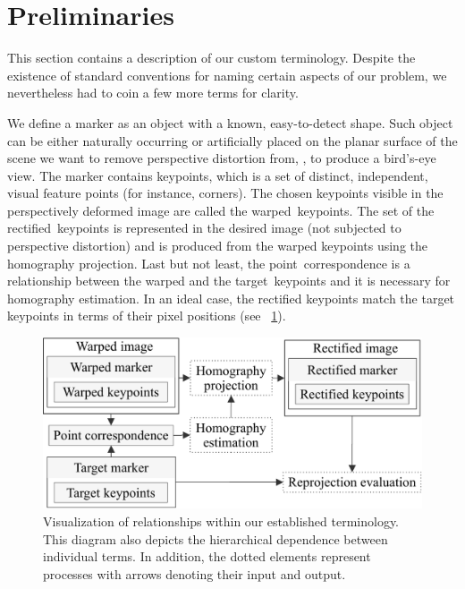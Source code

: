 \section{Preliminaries}
\label{sec:HomographyPreliminaries}

This section contains a description of our custom terminology. Despite the existence of standard conventions for naming certain aspects of our problem, we nevertheless had to coin a few more terms for clarity.

We define a marker as an object with a known, easy-to-detect shape. Such object can be either naturally occurring or artificially placed on the planar surface of the scene we want to remove perspective distortion from, \ietext{}, to produce a bird's-eye view. The marker contains keypoints, which is a set of distinct, independent, visual feature points (for instance, corners). The chosen keypoints visible in the perspectively deformed image are called the \mbox{warped keypoints}. The set of the \mbox{rectified keypoints} is represented in the desired image (not subjected to perspective distortion) and is produced from the warped keypoints using the homography projection. Last but not least, the \mbox{point correspondence} is a relationship between the warped and the \mbox{target keypoints} and it is necessary for homography estimation. In an ideal case, the rectified keypoints match the target keypoints in terms of their pixel positions (see \figtext{}~\ref{fig:HomographyTerminology}).

\begin{figure}[t]
    \centering
    \includegraphics[width=0.6\linewidth]{figures/homography/terminology.pdf}
    \caption[Homography ranking terminology]{Visualization of relationships within our established terminology. This diagram also depicts the hierarchical dependence between individual terms. In addition, the dotted elements represent processes with arrows denoting their input and output.}
    \label{fig:HomographyTerminology}
\end{figure}

